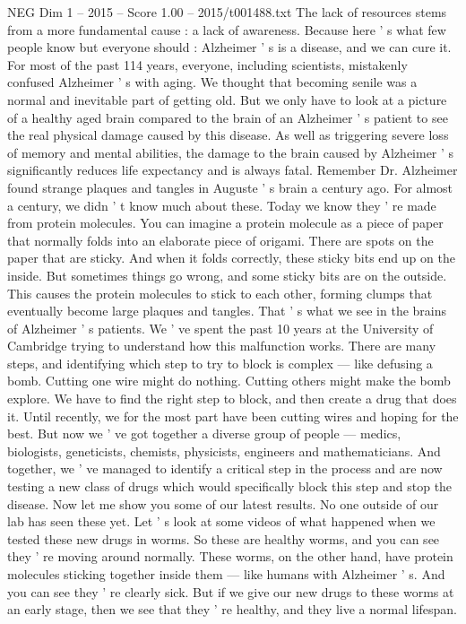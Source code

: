 \begin{textsample}{NEG Dim 1 – 2015 – Score 1.00 – 2015/t001488.txt}
The lack of resources stems from a more fundamental cause : a lack of awareness.
Because here ' s what few people know but everyone should : Alzheimer ' s is a disease, and we can cure it.
For most of the past 114 years, everyone, including scientists, mistakenly confused Alzheimer ' s with aging.
We thought that becoming senile was a normal and inevitable part of getting old.
But we only have to look at a picture of a healthy aged brain compared to the brain of an Alzheimer ' s patient to see the real physical damage caused by this disease.
As well as triggering severe loss of memory and mental abilities, the damage to the brain caused by Alzheimer ' s significantly reduces life expectancy and is always fatal.
Remember Dr.
Alzheimer found strange plaques and tangles in Auguste ' s brain a century ago.
For almost a century, we didn ' t know much about these.
Today we know they ' re made from protein molecules.
You can imagine a protein molecule as a piece of paper that normally folds into an elaborate piece of origami.
There are spots on the paper that are sticky.
And when it folds correctly, these sticky bits end up on the inside.
But sometimes things go wrong, and some sticky bits are on the outside.
This causes the protein molecules to stick to each other, forming clumps that eventually become large plaques and tangles.
That ' s what we see in the brains of Alzheimer ' s patients.
We ' ve spent the past 10 years at the University of Cambridge trying to understand how this malfunction works.
There are many steps, and identifying which step to try to block is complex — like defusing a bomb.
Cutting one wire might do nothing.
Cutting others might make the bomb explore.
We have to find the right step to block, and then create a drug that does it.
Until recently, we for the most part have been cutting wires and hoping for the best.
But now we ' ve got together a diverse group of people — medics, biologists, geneticists, chemists, physicists, engineers and mathematicians.
And together, we ' ve managed to identify a critical step in the process and are now testing a new class of drugs which would specifically block this step and stop the disease.
Now let me show you some of our latest results.
No one outside of our lab has seen these yet.
Let ' s look at some videos of what happened when we tested these new drugs in worms.
So these are healthy worms, and you can see they ' re moving around normally.
These worms, on the other hand, have protein molecules sticking together inside them — like humans with Alzheimer ' s.
And you can see they ' re clearly sick.
But if we give our new drugs to these worms at an early stage, then we see that they ' re healthy, and they live a normal lifespan.

\end{textsample}
